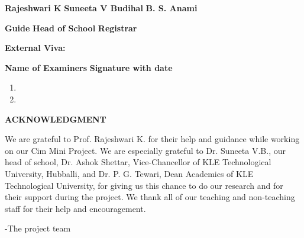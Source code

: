 \documentclass[12 pt]{report}
\begin{document}
\vspace{2cm}
\begin{small} \textbf{Rajeshwari K} \hspace{2cm} \textbf{ Suneeta V Budihal} \hspace{2.8cm} \textbf{ B. S. Anami} \linebreak
\end{small}
\vspace{1cm}
\hspace{1cm} \small{\textbf{Guide} \hspace{4cm} \textbf{Head of School} \hspace{4cm}  \textbf{Registrar}}


\vspace{0.8cm}

\begin{flushleft}
  \textbf{External Viva: \\}
\end{flushleft}
\textbf{Name of Examiners} \hspace{8cm} \textbf{Signature with date}
\begin{enumerate}
  \item
  \item
\end{enumerate}

\newpage
\begin{center}
  \begin{Large}
    \textbf{ACKNOWLEDGMENT}
  \end{Large}
\end{center}
We are grateful to Prof. Rajeshwari K. for their help and guidance while working on our
Cim Mini Project. We are especially grateful to Dr. Suneeta V.B., our head of school,
Dr. Ashok Shettar, Vice-Chancellor of KLE Technological University, Hubballi, and Dr.
P. G. Tewari, Dean Academics of KLE Technological University, for giving us this chance
to do our research and for their support during the project. We thank all of our teaching
and non-teaching staff for their help and encouragement.

\flushright
-The project team
\flushleft
\end{document}
